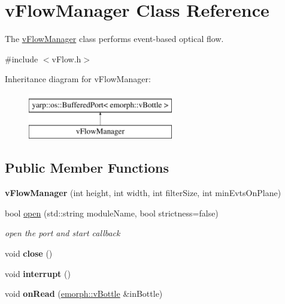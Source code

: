 \hypertarget{classvFlowManager}{\section{v\-Flow\-Manager Class Reference}
\label{classvFlowManager}
}


The \hyperlink{classvFlowManager}{v\-Flow\-Manager} class performs event-\/based optical flow.  




{\ttfamily \#include $<$v\-Flow.\-h$>$}

Inheritance diagram for v\-Flow\-Manager\-:\begin{figure}[H]
\begin{center}
\leavevmode
\includegraphics[height=2.000000cm]{classvFlowManager}
\end{center}
\end{figure}
\subsection*{Public Member Functions}
\begin{DoxyCompactItemize}
\item 
\hypertarget{classvFlowManager_a9d28c98ce6f6c0591a89f5055153e295}{{\bfseries v\-Flow\-Manager} (int height, int width, int filter\-Size, int min\-Evts\-On\-Plane)}\label{classvFlowManager_a9d28c98ce6f6c0591a89f5055153e295}

\item 
bool \hyperlink{classvFlowManager_a2c299db37662565d5b0c59679b790a4b}{open} (std\-::string module\-Name, bool strictness=false)
\begin{DoxyCompactList}\small\item\em open the port and start callback \end{DoxyCompactList}\item 
\hypertarget{classvFlowManager_abcf434ef8391ec6741c0754bc4a88ab8}{void {\bfseries close} ()}\label{classvFlowManager_abcf434ef8391ec6741c0754bc4a88ab8}

\item 
\hypertarget{classvFlowManager_a10d85ce69f60a672adba81aff4a046d8}{void {\bfseries interrupt} ()}\label{classvFlowManager_a10d85ce69f60a672adba81aff4a046d8}

\item 
\hypertarget{classvFlowManager_a67113d949355705533cc65aca8a15b40}{void {\bfseries on\-Read} (\hyperlink{classemorph_1_1vBottle}{emorph\-::v\-Bottle} \&in\-Bottle)}\label{classvFlowManager_a67113d949355705533cc65aca8a15b40}

\end{DoxyCompactItemize}


